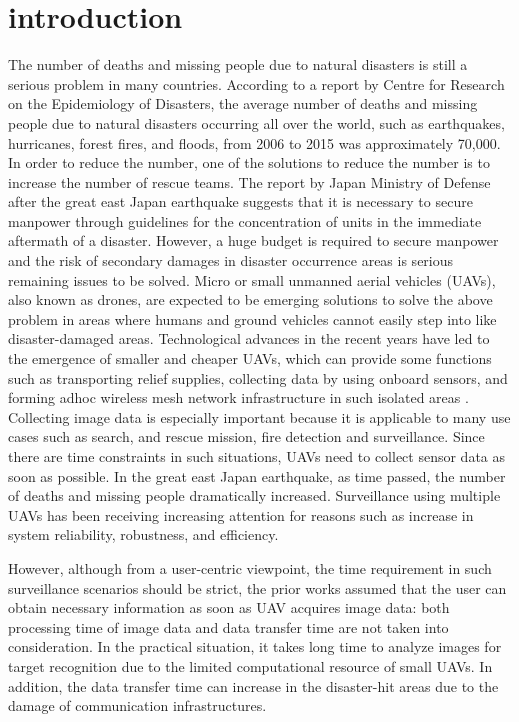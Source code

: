 \documentclass{ieeeaccess}
\begin{document}
\maketitle
\IEEEpeerreviewmaketitle

\section{introduction}\label{intro}
The number of deaths and missing people due to natural disasters is still a serious problem in many countries.
According to a report by Centre for Research on the Epidemiology of Disasters\cite{CRED2016}, the average number of deaths and missing people due to natural disasters occurring all over the world, such as earthquakes, hurricanes, forest fires, and floods, from 2006 to 2015 was approximately 70,000.
In order to reduce the number, one of the solutions to reduce the number is to increase the number of rescue teams.
The report by Japan Ministry of Defense after the great east Japan earthquake suggests that  it is necessary to secure manpower through guidelines for the concentration of units in the immediate aftermath of a disaster.
%
However, a huge budget is required to secure manpower and the risk of secondary damages in disaster occurrence areas is serious remaining issues to be solved\cite{disaster2011}.
%
Micro or small unmanned aerial vehicles (UAVs), also known as drones, are expected to be emerging solutions to solve the above problem in areas where humans and ground vehicles cannot easily step into like disaster-damaged areas.
Technological advances in the recent years have led to the emergence of smaller and cheaper UAVs, which can provide some functions such as transporting relief supplies, collecting data by using onboard sensors, and forming adhoc wireless mesh network infrastructure in such isolated areas \cite{Andre2014,Erdelj2016,Felice2014}.
Collecting image data is especially important because it is applicable to many use cases such as search, and rescue mission, fire detection and surveillance.
%
Since there are time constraints in such situations, UAVs need to collect sensor data as soon as possible.
In the great east Japan earthquake, as time passed, the number of deaths and missing people  dramatically increased\cite{japan2011}.
Surveillance using multiple UAVs has been receiving increasing attention for reasons such as increase in system reliability, robustness, and efficiency\cite{Lanillos2014,Maza2007,Meng2014,chang2016,Mirzaei2011}.

However, although from a user-centric viewpoint, the time requirement in such surveillance scenarios should be strict, the prior works assumed that the user can obtain necessary information as soon as UAV acquires image data: both processing time of image data and data transfer time are not taken into consideration. In the practical situation, it takes long time to analyze images for target recognition due to the limited computational resource of small UAVs. In addition, the data transfer time can increase in the disaster-hit areas due to the damage of communication infrastructures.
\end{document}
